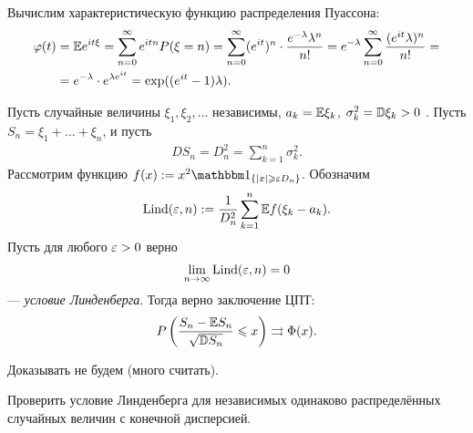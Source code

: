 \documentclass[../main.tex]{subfiles}
\begin{document}
\begin{remrk*}
 Вычислим характеристическую функцию распределения Пуассона:
 \begin{align*}
	 \varphi(t) &= \mathbb E e^{it\xi} = \sum_{n=0}^{\infty} e^{itn} P(\xi = n) = \sum_{n=0}^{\infty} (e^{it})^{n} \cdot \frac{e^{-\lambda} \lambda^{n}}{n!} = e^{-\lambda} \sum_{n = 0}^{\infty} \frac{(e^{it}\lambda)^{n}}{n!} = \\
	 &= e^{-\lambda} \cdot e^{\lambda e^{it}} = \exp((e^{it} - 1)\lambda).
 \end{align*}
\end{remrk*}

\begin{thm}
 Пусть случайные величины $ \xi_1, \xi_2, \ldots $  независимы, $ a_k = \mathbb E \xi_k $,  $ \sigma_k^{2} = \mathbb D \xi_k > 0 $ . Пусть $ S_n = \xi_1 + \ldots + \xi_n $, и пусть
 \begin{align*}
  DS_n = D_n^{2} = \sum_{k=1}^{n} \sigma_k^{2}.
 \end{align*} Рассмотрим функцию $ f(x) := x^{2} \Ind_{\left\{ \left| x \right| \geqslant \eps D_n \right\}} $. Обозначим
 \begin{align*}
  \mathrm{Lind}(\varepsilon, n) := \frac{1}{D_n^{2}} \sum_{k=1}^{n} \mathbb E f(\xi_k - a_k).
 \end{align*} Пусть для любого $ \varepsilon > 0 $ верно
  \begin{align*}
  \lim_{n \to \infty} \mathrm{Lind}(\varepsilon, n) = 0
 \end{align*} --- \textit{условие Линденберга}. Тогда верно заключение ЦПТ:
 \begin{align*}
  P \left( \frac{S_n - \mathbb E S_n}{\sqrt{\mathbb D S_n}} \leqslant x \right) \rightrightarrows \Phi(x).
 \end{align*}
\end{thm}

Доказывать не будем (много считать).

\begin{exercs*}
 Проверить условие Линденберга для независимых одинаково распределённых случайных величин с конечной дисперсией.
\end{exercs*}
\end{document}
